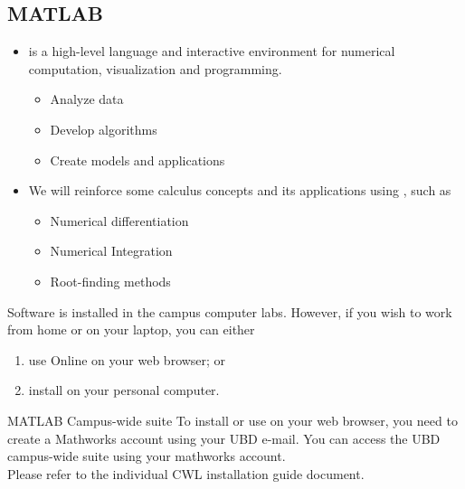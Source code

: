 \documentclass[,aspectratio=169]{beamer}
\begin{document}
\subsection{MATLAB}
\begin{frame}{}
\begin{itemize}
	\item {} is a high-level language and interactive environment for numerical computation,
	visualization and programming.
	\begin{itemize}
		\item Analyze data
		\item Develop algorithms
		\item Create models and applications
	\end{itemize}
	\item We will reinforce some calculus concepts and its applications using , such as
	\begin{itemize}
		\item Numerical differentiation
		\item Numerical Integration
		\item Root-finding methods
	\end{itemize}
\end{itemize}
\end{frame}

\begin{frame}{Software}
 is installed in the campus computer labs. 
However, if you wish to work from home or on your laptop, you can either
\begin{enumerate}
	\item use  Online on your web browser; or
	\item install  on your personal computer. 
\end{enumerate}

\begin{alertblock}{MATLAB Campus-wide suite}
To install or use  on your web browser, you need to create a Mathworks
account using your UBD e-mail. You can access the UBD campus-wide suite using your mathworks account.\\
Please refer to the  individual CWL installation guide document.
\end{alertblock}
\end{frame}
\end{document}
